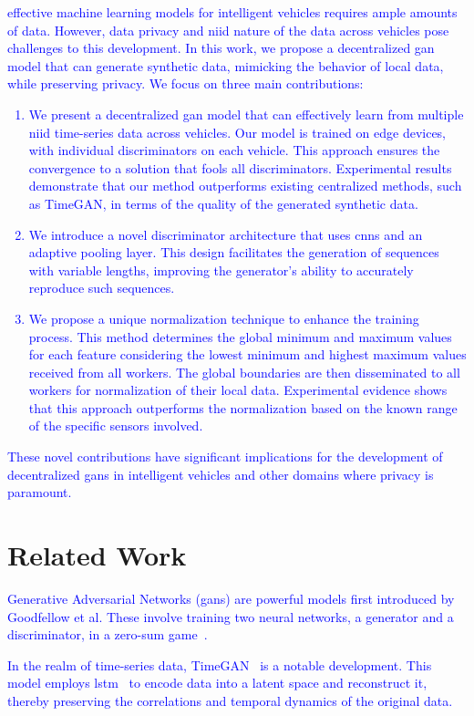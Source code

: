 \textcolor{blue}{
 effective machine learning models for intelligent vehicles requires ample amounts of data. However, data privacy and \gls*{niid} nature of the data across vehicles pose challenges to this development. In this work, we propose a decentralized \gls*{gan} model that can generate synthetic data, mimicking the behavior of local data, while preserving privacy. We focus on three main contributions:
%
\begin{enumerate}
    \item We present a decentralized \gls*{gan} model that can effectively learn from multiple \gls*{niid} time-series data across vehicles. Our model is trained on edge devices, with individual discriminators on each vehicle. This approach ensures the convergence to a solution that fools all discriminators. Experimental results demonstrate that our method outperforms existing centralized methods, such as TimeGAN, in terms of the quality of the generated synthetic data.
%
    \item We introduce a novel discriminator architecture that uses \glspl*{cnn} and an adaptive pooling layer. This design facilitates the generation of sequences with variable lengths, improving the generator's ability to accurately reproduce such sequences.
%
    \item We propose a unique normalization technique to enhance the training process. This method determines the global minimum and maximum values for each feature considering the lowest minimum and highest maximum values received from all workers. The global boundaries are then disseminated to all workers for normalization of their local data. Experimental evidence shows that this approach outperforms the normalization based on the known range of the specific sensors involved.
\end{enumerate}
%
These novel contributions have significant implications for the development of decentralized \glspl*{gan} in intelligent vehicles and other domains where privacy is paramount.}
%
\section{Related Work}
\textcolor{blue}{
Generative Adversarial Networks (\glspl*{gan}) are powerful models first introduced by Goodfellow et al. These involve training two neural networks, a generator and a discriminator, in a zero-sum game~\cite{goodfellow_generative_2014}.}

\textcolor{blue}{
In the realm of time-series data, TimeGAN~\cite{yoon_time-series_2019} is a notable development. This model employs \gls*{lstm}~\cite{hochreiter_long_1997} to encode data into a latent space and reconstruct it, thereby preserving the correlations and temporal dynamics of the original data.}

